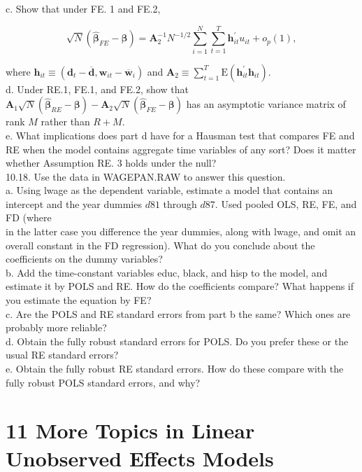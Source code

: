 \documentclass[10pt]{article}
\begin{document}
c. Show that under FE. 1 and FE.2,

$$
\sqrt{N}\left(\hat{\boldsymbol{\beta}}_{F E}-\boldsymbol{\beta}\right)=\mathbf{A}_{2}^{-1} N^{-1 / 2} \sum_{i=1}^{N} \sum_{t=1}^{T} \mathbf{h}_{i t}^{\prime} u_{i t}+o_{p}(1),
$$

where $\mathbf{h}_{i t} \equiv\left(\mathbf{d}_{t}-\overline{\mathbf{d}}, \mathbf{w}_{i t}-\overline{\mathbf{w}}_{i}\right)$ and $\mathbf{A}_{2} \equiv \sum_{t=1}^{T} \mathrm{E}\left(\mathbf{h}_{i t}^{\prime} \mathbf{h}_{i t}\right)$.\\
d. Under RE.1, FE.1, and FE.2, show that $\mathbf{A}_{1} \sqrt{N}\left(\hat{\boldsymbol{\beta}}_{R E}-\boldsymbol{\beta}\right)-\mathbf{A}_{2} \sqrt{N}\left(\hat{\boldsymbol{\beta}}_{F E}-\boldsymbol{\beta}\right)$ has an asymptotic variance matrix of rank $M$ rather than $R+M$.\\
e. What implications does part d have for a Hausman test that compares FE and RE when the model contains aggregate time variables of any sort? Does it matter whether Assumption RE. 3 holds under the null?\\
10.18. Use the data in WAGEPAN.RAW to answer this question.\\
a. Using lwage as the dependent variable, estimate a model that contains an intercept and the year dummies $d 81$ through $d 87$. Used pooled OLS, RE, FE, and FD (where\\
in the latter case you difference the year dummies, along with lwage, and omit an overall constant in the FD regression). What do you conclude about the coefficients on the dummy variables?\\
b. Add the time-constant variables educ, black, and hisp to the model, and estimate it by POLS and RE. How do the coefficients compare? What happens if you estimate the equation by FE?\\
c. Are the POLS and RE standard errors from part b the same? Which ones are probably more reliable?\\
d. Obtain the fully robust standard errors for POLS. Do you prefer these or the usual RE standard errors?\\
e. Obtain the fully robust RE standard errors. How do these compare with the fully robust POLS standard errors, and why?

\section*{11 More Topics in Linear Unobserved Effects Models}
\end{document}
